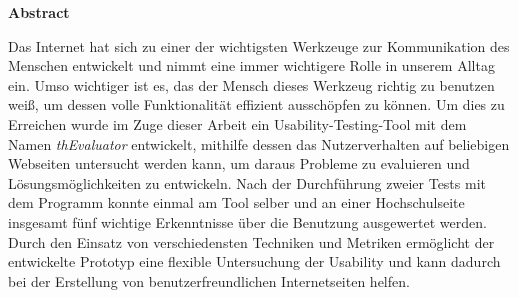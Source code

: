 \vspace*{2cm}

\begin{center}
    \textbf{Abstract}
\end{center}

\vspace*{1cm}

\noindent Das Internet hat sich zu einer der wichtigsten Werkzeuge zur Kommunikation des Menschen entwickelt und nimmt eine immer wichtigere Rolle in unserem Alltag ein. Umso wichtiger ist es, das der Mensch dieses Werkzeug richtig zu benutzen weiß, um dessen volle Funktionalität effizient ausschöpfen zu können. Um dies zu Erreichen wurde im Zuge dieser Arbeit ein Usability-Testing-Tool mit dem Namen \textit{thEvaluator} entwickelt, mithilfe dessen das Nutzerverhalten auf beliebigen Webseiten untersucht werden kann, um daraus Probleme zu evaluieren und Lösungsmöglichkeiten zu entwickeln. Nach der Durchführung zweier Tests mit dem Programm konnte einmal am Tool selber und an einer Hochschulseite insgesamt fünf wichtige Erkenntnisse über die Benutzung ausgewertet werden. Durch den Einsatz von verschiedensten Techniken und Metriken ermöglicht der entwickelte Prototyp eine flexible Untersuchung der Usability und kann dadurch bei der Erstellung von benutzerfreundlichen Internetseiten helfen.
